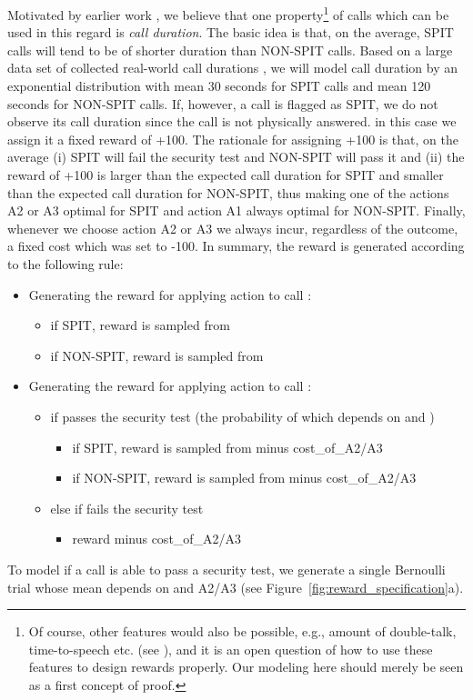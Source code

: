 \documentclass{llncs}
\begin{document}
Motivated by earlier work \cite{SPRIT-SPIT}, we believe that one property\footnote{Of course, other features
would also be possible, e.g., amount of double-talk, time-to-speech etc. (see \cite{SPRIT-SPIT}),
and it is an open question of how to use these features to design rewards properly. Our modeling here should merely be 
seen as a first concept of proof.} of calls which can be used
in this regard is {\em call duration}. The basic idea is that,
on the average, SPIT calls will tend to be of shorter duration than NON-SPIT calls. 
Based on a large data set of collected real-world call durations \cite{eagle09realitydata},
we will model call duration by an exponential distribution with mean
30 seconds for SPIT calls and mean 120 seconds for NON-SPIT calls. 
If, however, a call is flagged as SPIT, we do not observe its call duration
since the call is not physically answered. in this case we assign it a fixed 
reward of +100. The rationale for assigning +100 is that, on the
average (i) SPIT will fail the security test and NON-SPIT will pass it and (ii) the reward
of +100 is larger than the expected call duration for SPIT and smaller than the expected call
duration for NON-SPIT, thus making one of the actions A2 or A3 optimal for SPIT and action 
A1 always optimal for NON-SPIT.
Finally, whenever we choose action A2 or A3 we always incur, regardless of the outcome, a fixed
cost which was set to -100. In summary, the reward is generated according to the following
rule:
\begin{itemize}
 \footnotesize
 \item Generating the reward for applying action  to call :
     \begin{itemize}
        \item if  SPIT, reward  is sampled from 
        \item if  NON-SPIT, reward  is sampled from  
     \end{itemize}
 \item Generating the reward for applying action  to call :
     \begin{itemize}
        \item if  passes the security test (the probability of which depends on  and )
        \begin{itemize}
            \item if  SPIT, reward  is sampled from  minus cost\_of\_A2/A3
            \item if  NON-SPIT, reward  is sampled from  minus cost\_of\_A2/A3
        \end{itemize}
        \item else if  fails the security test
        \begin{itemize}
            \item reward  minus cost\_of\_A2/A3 
        \end{itemize}
    \end{itemize} 
\end{itemize}
To model if a call  is able to pass a security test, we generate a single Bernoulli trial whose mean
depends on  and A2/A3 (see Figure~\ref{fig:reward_specification}a).
\end{document}
